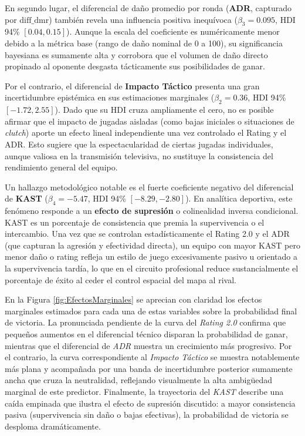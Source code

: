 \documentclass[twocolumn,10pt]{article}
\begin{document}
En segundo lugar, el diferencial de daño promedio por ronda (\textbf{ADR}, capturado por $\text{diff\_dmr}$) también revela una influencia positiva inequívoca ($\beta_3 = 0.095$, HDI 94\% $[0.04, 0.15]$). Aunque la escala del coeficiente es numéricamente menor debido a la métrica base (rango de daño nominal de 0 a 100), su significancia bayesiana es sumamente alta y corrobora que el volumen de daño directo propinado al oponente desgasta tácticamente sus posibilidades de ganar.

Por el contrario, el diferencial de \textbf{Impacto Táctico} presenta una gran incertidumbre epistémica en sus estimaciones marginales ($\beta_2 = 0.36$, HDI 94\% $[-1.72, 2.55]$). Dado que su HDI cruza ampliamente el cero, no es posible afirmar que el impacto de jugadas aisladas (como bajas iniciales o situaciones de \textit{clutch}) aporte un efecto lineal independiente una vez controlado el Rating y el ADR. Esto sugiere que la espectacularidad de ciertas jugadas individuales, aunque valiosa en la transmisión televisiva, no sustituye la consistencia del rendimiento general del equipo.

Un hallazgo metodológico notable es el fuerte coeficiente negativo del diferencial de \textbf{KAST} ($\beta_4 = -5.47$, HDI 94\% $[-8.29, -2.80]$). En analítica deportiva, este fenómeno responde a un \textbf{efecto de supresión} o colinealidad inversa condicional. KAST es un porcentaje de consistencia que premia la supervivencia o el intercambio. Una vez que se controlan estadísticamente el Rating 2.0 y el ADR (que capturan la agresión y efectividad directa), un equipo con mayor KAST pero menor daño o rating refleja un estilo de juego excesivamente pasivo u orientado a la supervivencia tardía, lo que en el circuito profesional reduce sustancialmente el porcentaje de éxito al ceder el control espacial del mapa al rival.

En la Figura \ref{fig:EfectosMarginales} se aprecian con claridad los efectos marginales estimados para cada una de estas variables sobre la probabilidad final de victoria. La pronunciada pendiente de la curva del \textit{Rating 2.0} confirma que pequeños aumentos en el diferencial técnico disparan la probabilidad de ganar, mientras que el diferencial de \textit{ADR} muestra un crecimiento más progresivo. Por el contrario, la curva correspondiente al \textit{Impacto Táctico} se muestra notablemente más plana y acompañada por una banda de incertidumbre posterior sumamente ancha que cruza la neutralidad, reflejando visualmente la alta ambigüedad marginal de este predictor. Finalmente, la trayectoria del \textit{KAST} describe una caída empinada que ilustra el efecto de supresión discutido: a mayor consistencia pasiva (supervivencia sin daño o bajas efectivas), la probabilidad de victoria se desploma dramáticamente.
\end{document}
